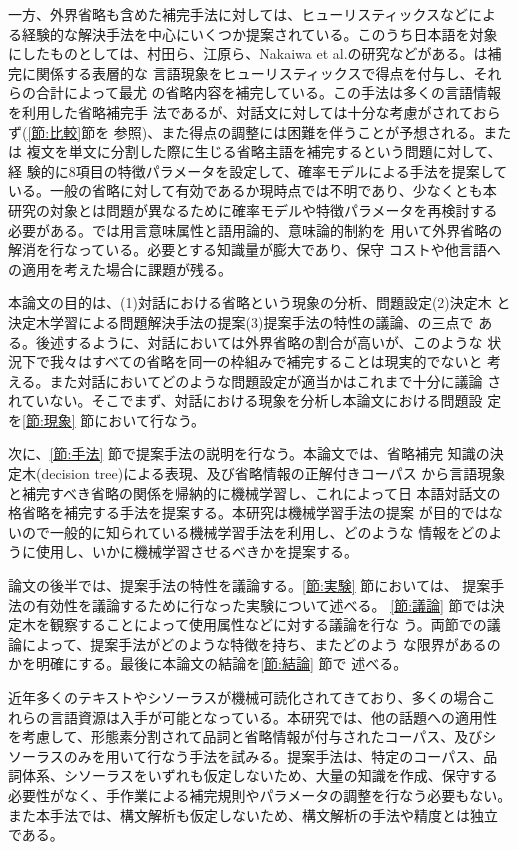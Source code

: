 一方、外界省略も含めた補完手法に対しては、ヒューリスティックスなどによ
る経験的な解決手法を中心にいくつか提案されている。このうち日本語を対象
にしたものとしては、村田ら\cite{村田}、江原ら\cite{江原}、Nakaiwa et
al.\cite{Nakaiwa}の研究などがある。\cite{村田}は補完に関係する表層的な
言語現象をヒューリスティックスで得点を付与し、それらの合計によって最尤
の省略内容を補完している。この手法は多くの言語情報を利用した省略補完手
法であるが、対話文に対しては十分な考慮がされておらず(\ref{節:比較}節を
参照)、また得点の調整には困難を伴うことが予想される。また\cite{江原}は
複文を単文に分割した際に生じる省略主語を補完するという問題に対して、経
験的に8項目の特徴パラメータを設定して、確率モデルによる手法を提案して
いる。一般の省略に対して有効であるか現時点では不明であり、少なくとも本
研究の対象とは問題が異なるために確率モデルや特徴パラメータを再検討する
必要がある。{}\cite{Nakaiwa}では用言意味属性と語用論的、意味論的制約を
用いて外界省略の解消を行なっている。必要とする知識量が膨大であり、保守
コストや他言語への適用を考えた場合に課題が残る。

本論文の目的は、(1)対話における省略という現象の分析、問題設定(2)決定木
と決定木学習による問題解決手法の提案(3)提案手法の特性の議論、の三点で
ある。後述するように、対話においては外界省略の割合が高いが、このような
状況下で我々はすべての省略を同一の枠組みで補完することは現実的でないと
考える。また対話においてどのような問題設定が適当かはこれまで十分に議論
されていない。そこでまず、対話における現象を分析し本論文における問題設
定を{}\ref{節:現象} 節において行なう。

次に、{}\ref{節:手法} 節で提案手法の説明を行なう。本論文では、省略補完
知識の決定木(decision tree)による表現、及び省略情報の正解付きコーパス
から言語現象と補完すべき省略の関係を帰納的に機械学習し、これによって日
本語対話文の格省略を補完する手法を提案する。本研究は機械学習手法の提案
が目的ではないので一般的に知られている機械学習手法を利用し、どのような
情報をどのように使用し、いかに機械学習させるべきかを提案する。

論文の後半では、提案手法の特性を議論する。{}\ref{節:実験} 節においては、
提案手法の有効性を議論するために行なった実験について述べる。
\ref{節:議論} 節では決定木を観察することによって使用属性などに対する議論を行な
う。両節での議論によって、提案手法がどのような特徴を持ち、またどのよう
な限界があるのかを明確にする。最後に本論文の結論を{}\ref{節:結論} 節で
述べる。

近年多くのテキストやシソーラスが機械可読化されてきており、多くの場合こ
れらの言語資源は入手が可能となっている。本研究では、他の話題への適用性
を考慮して、形態素分割されて品詞と省略情報が付与されたコーパス、及びシ
ソーラスのみを用いて行なう手法を試みる。提案手法は、特定のコーパス、品
詞体系、シソーラスをいずれも仮定しないため、大量の知識を作成、保守する
必要性がなく、手作業による補完規則やパラメータの調整を行なう必要もない。
また本手法では、構文解析も仮定しないため、構文解析の手法や精度とは独立
である。

